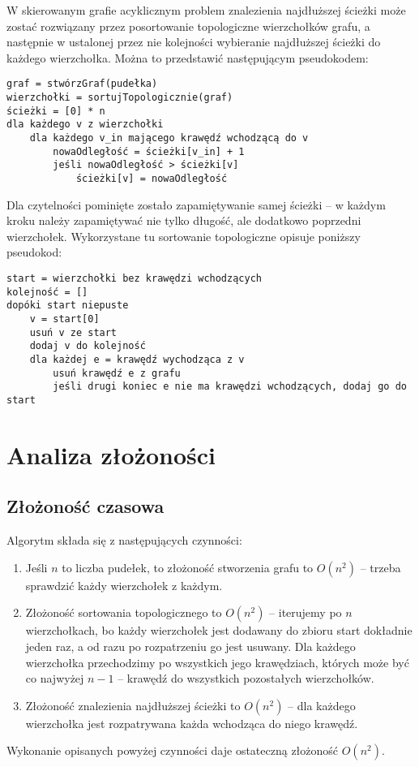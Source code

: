 \documentclass{article}
\begin{document}
W skierowanym grafie acyklicznym problem znalezienia najdłuższej ścieżki może zostać rozwiązany przez posortowanie topologiczne wierzchołków grafu, a następnie w ustalonej przez nie kolejności wybieranie najdłuższej ścieżki do każdego wierzchołka. Można to przedstawić następującym pseudokodem:
\begin{verbatim}
graf = stwórzGraf(pudełka)
wierzchołki = sortujTopologicznie(graf)
ścieżki = [0] * n
dla każdego v z wierzchołki
	dla każdego v_in mającego krawędź wchodzącą do v
		nowaOdległość = ścieżki[v_in] + 1
		jeśli nowaOdległość > ścieżki[v]
			ścieżki[v] = nowaOdległość 
\end{verbatim}
Dla czytelności pominięte zostało zapamiętywanie samej ścieżki -- w każdym kroku należy zapamiętywać nie tylko długość, ale dodatkowo poprzedni wierzchołek. Wykorzystane tu sortowanie topologiczne opisuje poniższy pseudokod:
\begin{verbatim}
start = wierzchołki bez krawędzi wchodzących
kolejność = []
dopóki start niepuste
	v = start[0]
	usuń v ze start
	dodaj v do kolejność
	dla każdej e = krawędź wychodząca z v
		usuń krawędź e z grafu
		jeśli drugi koniec e nie ma krawędzi wchodzących, dodaj go do start
\end{verbatim}
\section{Analiza złożoności}
\subsection{Złożoność czasowa}
Algorytm składa się z następujących czynności:
\begin{enumerate}
\item Jeśli $n$ to liczba pudełek, to złożoność stworzenia grafu to $O(n^2)$ -- trzeba sprawdzić każdy wierzchołek z każdym.
\item Złożoność sortowania topologicznego to $O(n^2)$ -- iterujemy po $n$ wierzchołkach, bo każdy wierzchołek jest dodawany do zbioru start dokładnie jeden raz, a od razu po rozpatrzeniu go jest usuwany. Dla każdego wierzchołka przechodzimy po wszystkich jego krawędziach, których może być co najwyżej $n-1$ -- krawędź do wszystkich pozostałych wierzchołków.
\item Złożoność znalezienia najdłuższej ścieżki to $O(n^2)$ -- dla każdego wierzchołka jest rozpatrywana każda wchodząca do niego krawędź.
\end{enumerate}
Wykonanie opisanych powyżej czynności daje ostateczną złożoność $O(n^2)$.
\end{document}
